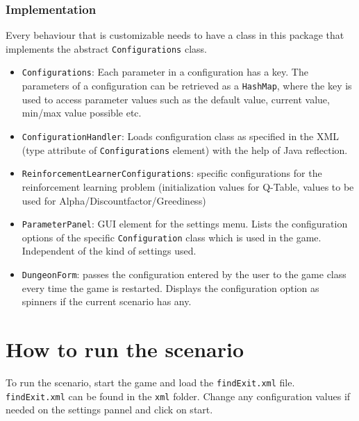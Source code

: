 \documentclass[a4paper,10pt]{scrartcl}
\begin{document}
\subsubsection{Implementation}
Every behaviour that is customizable needs to have a class in this package that implements the abstract \verb|Configurations| class.
\begin{itemize}
\item \verb|Configurations|: Each parameter in a configuration has a key. The parameters of a configuration can be retrieved as a \verb|HashMap|, where the key is used to access parameter values such as the default value, current value, min/max value possible etc. 
\item \verb|ConfigurationHandler|: Loads configuration class as specified in the XML (type attribute of \verb|Configurations| element) with the help of Java reflection.
\item \verb|ReinforcementLearnerConfigurations|: specific configurations for the reinforcement learning problem (initialization values for Q-Table, values to be used for Alpha/Discountfactor/Greediness)
\end{itemize}

\begin{itemize}
\item \verb|ParameterPanel|: GUI element for the settings menu. Lists the configuration options of the specific \verb|Configuration| class which is used in the game. Independent of the kind of settings used.
\item \verb|DungeonForm|: passes  the configuration entered by the user to the game class every time the game is restarted. Displays the configuration option as spinners if the current scenario has any.
\end{itemize}


\section{How to run the scenario}\label{sec:instructions}
To run the scenario, start the game and load the \verb|findExit.xml| file. \verb|findExit.xml| can be found in the \verb|xml| folder.  Change any configuration values if needed on the settings pannel and click on start.  
\end{document}
